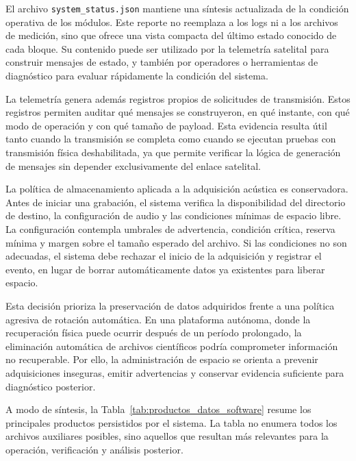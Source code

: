 El archivo \texttt{system\_status.json} mantiene una síntesis actualizada de la condición operativa de los módulos. Este reporte no reemplaza a los logs ni a los archivos de medición, sino que ofrece una vista compacta del último estado conocido de cada bloque. Su contenido puede ser utilizado por la telemetría satelital para construir mensajes de estado, y también por operadores o herramientas de diagnóstico para evaluar rápidamente la condición del sistema.

La telemetría genera además registros propios de solicitudes de transmisión. Estos registros permiten auditar qué mensajes se construyeron, en qué instante, con qué modo de operación y con qué tamaño de payload. Esta evidencia resulta útil tanto cuando la transmisión se completa como cuando se ejecutan pruebas con transmisión física deshabilitada, ya que permite verificar la lógica de generación de mensajes sin depender exclusivamente del enlace satelital.

La política de almacenamiento aplicada a la adquisición acústica es conservadora. Antes de iniciar una grabación, el sistema verifica la disponibilidad del directorio de destino, la configuración de audio y las condiciones mínimas de espacio libre. La configuración contempla umbrales de advertencia, condición crítica, reserva mínima y margen sobre el tamaño esperado del archivo. Si las condiciones no son adecuadas, el sistema debe rechazar el inicio de la adquisición y registrar el evento, en lugar de borrar automáticamente datos ya existentes para liberar espacio.

Esta decisión prioriza la preservación de datos adquiridos frente a una política agresiva de rotación automática. En una plataforma autónoma, donde la recuperación física puede ocurrir después de un período prolongado, la eliminación automática de archivos científicos podría comprometer información no recuperable. Por ello, la administración de espacio se orienta a prevenir adquisiciones inseguras, emitir advertencias y conservar evidencia suficiente para diagnóstico posterior.

A modo de síntesis, la Tabla~\ref{tab:productos_datos_software} resume los principales productos persistidos por el sistema. La tabla no enumera todos los archivos auxiliares posibles, sino aquellos que resultan más relevantes para la operación, verificación y análisis posterior.

